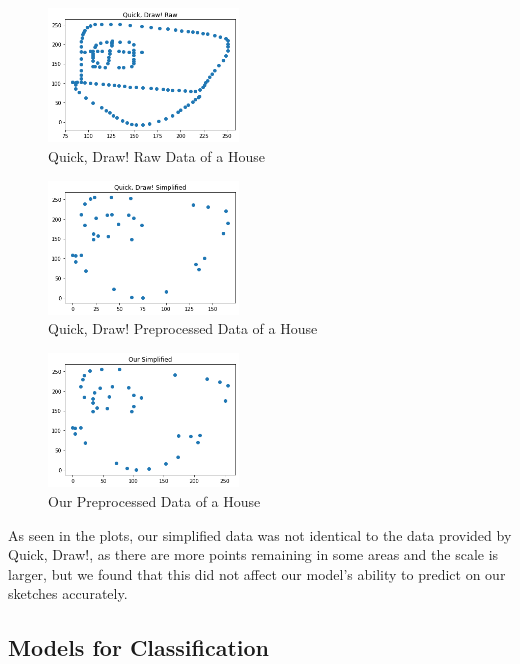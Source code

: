 \documentclass[10pt,twocolumn,letterpaper]{article}
\begin{document}
\begin{figure}[H]
  \centering
  \includegraphics[width=0.45\textwidth]{quickdraw_raw_house.png}
  \caption{Quick, Draw! Raw Data of a House}
\end{figure}

\begin{figure}[H]
  \centering
  \includegraphics[width=0.45\textwidth]{quickdraw_simplified_house.png}
  \caption{Quick, Draw! Preprocessed Data of a House}
\end{figure}

\begin{figure}[H]
  \centering
  \includegraphics[width=0.45\textwidth]{our_simplified_house.png}
  \caption{Our Preprocessed Data of a House}
\end{figure}

As seen in the plots, our simplified data was not identical to the data provided by Quick, Draw!, as there are more points remaining in some areas and the scale is larger, but we found that this did not affect our model’s ability to predict on our sketches accurately. 

\subsection{Models for Classification}
\end{document}
